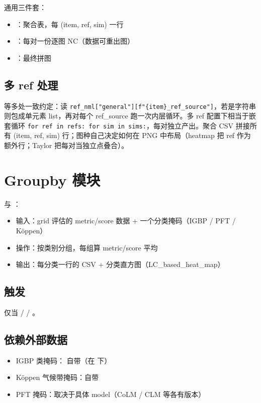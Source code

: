 通用三件套：

\begin{itemize}
  \item {}：聚合表，每 (item, ref, sim) 一行
  \item {}：每对一份逐图 NC（数据可重出图）
  \item {}：最终拼图
\end{itemize}

\subsection{多 ref 处理}

 等多处一致约定：读 \texttt{ref\_nml["general"][f"\{item\}\_ref\_source"]}，若是字符串则包成单元素 list，再对每个 ref\_source 跑一次内层循环。多 ref 配置下相当于嵌套循环 \texttt{for ref in refs: for sim in sims:}，每对独立产出。聚合 CSV 拼接所有 (item, ref, sim) 行；图种自己决定如何在 PNG 中布局（heatmap 把 ref 作为额外行；Taylor 把每对当独立点叠合）。

\section{Groupby 模块}

 与 ：

\begin{itemize}
  \item 输入：grid 评估的 metric/score 数据 + 一个分类掩码（IGBP / PFT / Köppen）
  \item 操作：按类别分组，每组算 metric/score 平均
  \item 输出：每分类一行的 CSV + 分类直方图（LC\_based\_heat\_map）
\end{itemize}

\subsection{触发}

仅当  /  / 。

\subsection{依赖外部数据}

\begin{itemize}
  \item IGBP 类掩码：\openbench{} 自带（在  下）
  \item Köppen 气候带掩码：自带
  \item PFT 掩码：取决于具体 model（CoLM / CLM 等各有版本）
\end{itemize}

